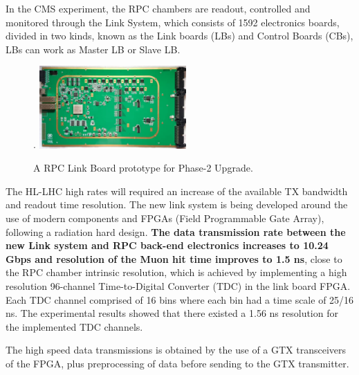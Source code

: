 




In the CMS experiment, the RPC chambers are readout, controlled and monitored through the Link System, which consists of 1592 electronics boards, divided in two kinds, known as the Link boards (LBs) and Control Boards (CBs), LBs can work as Master LB or Slave LB.  


\begin{figure}
    \caption{\footnotesize A RPC Link Board prototype for Phase-2 Upgrade.}
    \label{link_system}.
    \includegraphics[width=0.5\textwidth]{uioposter-images/link_system_board.png}
\end{figure}

The HL-LHC high rates will required an increase of the available TX bandwidth and readout time resolution. The new link system is being developed around the use of modern components and FPGAs (Field Programmable Gate Array), following a radiation hard design. \textbf{The data transmission rate between the new Link system and RPC back-end electronics increases to 10.24 Gbps and resolution of the Muon hit time improves to 1.5 ns}, close to the RPC chamber intrinsic resolution, which is achieved by implementing a high resolution 96-channel Time-to-Digital Converter (TDC) in the link board FPGA. Each TDC channel comprised of 16 bins where each bin had a time scale of 25/16 ns. The experimental results showed that there existed a 1.56 ns resolution for the implemented TDC channels. 

The high speed data transmissions is obtained by the use of a GTX transceivers of the FPGA, plus preprocessing of data before sending to the GTX transmitter.






